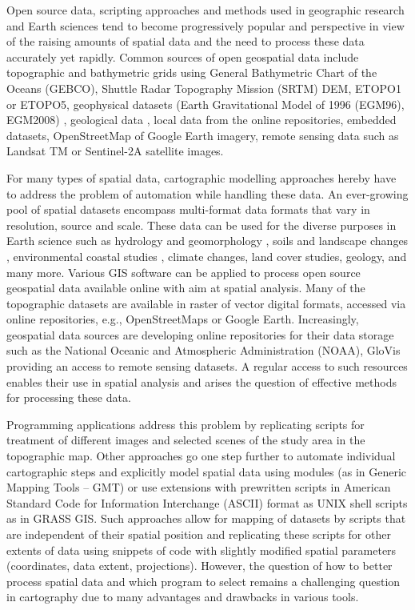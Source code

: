 \documentclass[technologies,article,submit,pdftex,moreauthors]{Definitions/mdpi}
\begin{document}
Open source data, scripting approaches and methods used in geographic research and Earth sciences  \cite{Rey,s23010056} tend to become progressively popular and perspective in view of the raising amounts of spatial data and the need to process these data accurately yet rapidly. Common sources of open geospatial data include topographic and bathymetric grids \cite{Basith,Habib} using General Bathymetric Chart of the Oceans (GEBCO), Shuttle Radar Topography Mission (SRTM) DEM, ETOPO1 or ETOPO5, geophysical datasets (Earth Gravitational Model of 1996 (EGM96), EGM2008) \cite{Lemenkova2020a}, geological data \cite{Lemenkova2021a}, local data from the online repositories, embedded datasets, OpenStreetMap of Google Earth imagery, remote sensing data such as Landsat TM or Sentinel-2A satellite images.

For many types of spatial data, cartographic modelling approaches hereby have to address the problem of automation while handling these data. An ever-growing pool of spatial datasets encompass multi-format data formats that vary in resolution, source and scale. These data can be used for the diverse purposes in Earth science such as hydrology and geomorphology \cite{Teixeira}, soils and landscape changes \cite{Savulescu}, environmental coastal studies \cite{Hernandez}, climate changes, land cover studies, geology, and many more. Various GIS software can be applied to process open source geospatial data available online with aim at spatial analysis. Many of the topographic datasets are available in raster of vector digital formats, accessed  via online repositories, e.g., OpenStreetMaps or Google Earth. Increasingly, geospatial data sources are developing online repositories for their data storage such as the National Oceanic and Atmospheric Administration (NOAA), GloVis providing an access to remote sensing datasets. A regular access to such resources enables their use in spatial analysis and arises the question of effective methods for processing these data.

Programming applications address this problem by replicating scripts for treatment of different images and selected scenes of the study area in the topographic map. Other approaches go one step further to automate individual cartographic steps and explicitly model spatial data using modules (as in Generic Mapping Tools -- GMT) or use extensions with prewritten scripts in American Standard Code for Information Interchange (ASCII) format as UNIX shell scripts as in GRASS GIS. Such approaches allow for mapping of datasets by scripts that are independent of their spatial position and replicating these scripts for other extents of data using snippets of code with slightly modified spatial parameters (coordinates, data extent, projections). However, the question of how to better process spatial data and which program to select remains a challenging question in cartography due to many advantages and drawbacks in various tools. 
\end{document}

